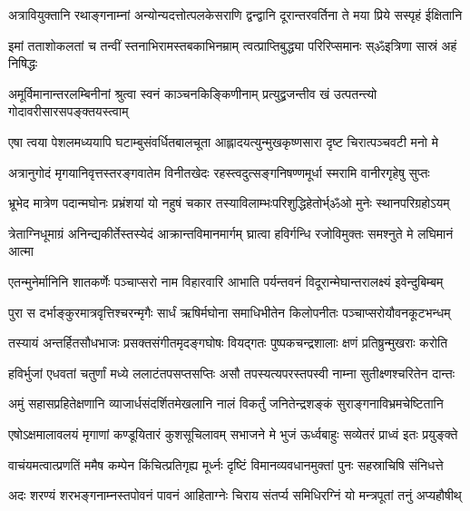 \twolineshloka
{अत्रावियुक्तानि रथाङ्गनाम्नां अन्योन्यदत्तोत्पलकेसराणि}
{द्वन्द्वानि दूरान्तरवर्तिना ते मया प्रिये सस्पृहं ईक्षितानि}%

\twolineshloka
{इमां तताशोकलतां च तन्वीं स्तनाभिरामस्तबकाभिनम्राम्}
{त्वत्प्राप्तिबुद्ध्या परिरिप्समानः स्ॐइत्रिणा सास्रं अहं निषिद्धः}%

\twolineshloka
{अमूर्विमानान्तरलम्बिनीनां श्रुत्वा स्वनं काञ्चनकिङ्किणीनाम्}
{प्रत्युद्व्रजन्तीव खं उत्पतन्त्यो गोदावरीसारसपङ्क्तयस्त्वाम्}%

\twolineshloka
{एषा त्वया पेशलमध्ययापि घटाम्बुसंवर्धितबालचूता}
{आह्लादयत्युन्मुखकृष्णसारा दृष्ट चिरात्पञ्चवटी मनो मे}%

\twolineshloka
{अत्रानुगोदं मृगयानिवृत्तस्तरङ्गवातेम विनीतखेदः}
{रहस्त्वदुत्सङ्गनिषण्णमूर्धा स्मरामि वानीरगृहेषु सुप्तः}%

\twolineshloka
{भ्रूभेद मात्रेण पदान्मघोनः प्रभ्रंशयां यो नहुषं चकार}
{तस्याविलाम्भःपरिशुद्धिहेतोर्भ्ॐओ मुनेः स्थानपरिग्रहोऽयम्}%

\twolineshloka
{त्रेताग्निधूमाग्रं अनिन्द्यकीर्तेस्तस्येदं आक्रान्तविमानमार्गम्}
{घ्रात्वा हविर्गन्धि रजोविमुक्तः समश्नुते मे लघिमानं आत्मा}%

\twolineshloka
{एतन्मुनेर्मानिनि शातकर्णेः पञ्चाप्सरो नाम विहारवारि}
{आभाति पर्यन्तवनं विदूरान्मेघान्तरालक्ष्यं इवेन्दुबिम्बम्}%

\twolineshloka
{पुरा स दर्भाङ्कुरमात्रवृत्तिश्चरन्मृगैः सार्धं ऋषिर्मघोना}
{समाधिभीतेन किलोपनीतः पञ्चाप्सरोयौवनकूटभन्धम्}%

\twolineshloka
{तस्यायं अन्तर्हितसौधभाजः प्रसक्तसंगीतमृदङ्गघोषः}
{वियद्गतः पुष्पकचन्द्रशालाः क्षणं प्रतिष्रुन्मुखराः करोति}%

\twolineshloka
{हविर्भुजां एधवतां चतुर्णां मध्ये ललाटंतपसप्तसप्तिः}
{असौ तपस्यत्यपरस्तपस्वी नाम्ना सुतीक्ष्णश्चरितेन दान्तः}%

\twolineshloka
{अमुं सहासप्रहितेक्षणानि व्याजार्धसंदर्शितमेखलानि}
{नालं विकर्तुं जनितेन्द्रशङ्कं सुराङ्गनाविभ्रमचेष्टितानि}%

\twolineshloka
{एषोऽक्षमालावलयं मृगाणां कण्डूयितारं कुशसूचिलावम्}
{सभाजने मे भुजं ऊर्ध्वबाहुः सव्येतरं प्राध्वं इतः प्रयुङ्क्ते}%

\twolineshloka
{वाचंयमत्वात्प्रणतिं ममैष कम्पेन किंचित्प्रतिगृह्य मूर्ध्नः}
{दृष्टिं विमानव्यवधानमुक्तां पुनः सहस्राचिषि संनिधत्ते}%

\twolineshloka
{अदः शरण्यं शरभङ्गनाम्नस्तपोवनं पावनं आहिताग्नेः}
{चिराय संतर्प्य समिधिरग्निं यो मन्त्रपूतां तनुं अप्यहौषीथ्}%

